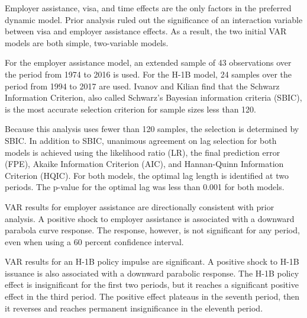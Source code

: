 \documentclass[review]{elsarticle}
\begin{document}
Employer assistance, visa, and time effects are the only factors in the preferred dynamic model.
Prior analysis ruled out the significance of an interaction variable between
visa and employer assistance effects.
As a result, the two initial VAR models are both simple, two-variable models.

For the employer assistance model,
an extended sample of 43 observations
over the period from 1974 to 2016 is used.
For the H-1B model, 24 samples over the period from 1994 to 2017 are used.
Ivanov and Kilian find that the Schwarz Information Criterion,
also called Schwarz's Bayesian information criteria (SBIC),
is the most accurate selection criterion for sample sizes less than 120\cite{ivanov2005practitioner}.

Because this analysis uses fewer than 120 samples, the selection is determined by SBIC.
In addition to SBIC, unanimous agreement on lag selection for both models is achieved using the likelihood ratio (LR),
the final prediction error (FPE), Akaike Information Criterion (AIC), and Hannan-Quinn Information Criterion (HQIC).
For both models, the optimal lag length is identified at two periods.
The p-value for the optimal lag was less than 0.001 for both models.

VAR results for employer assistance are directionally consistent with prior analysis.
A positive shock to employer assistance is associated with a downward parabola curve response.
The response, however, is not significant for any period, even when using a 60 percent confidence interval.

VAR results for an H-1B policy impulse are significant.
A positive shock to H-1B issuance is also associated with a downward parabolic response.
The H-1B policy effect is insignificant for the first two periods,
but it reaches a significant positive effect in the third period.
The positive effect plateaus in the seventh period,
then it reverses and reaches permanent insignificance in the eleventh period.
\end{document}
